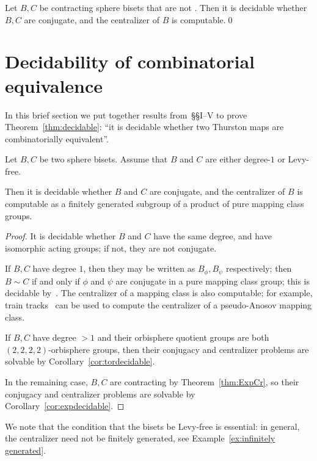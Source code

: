 \documentclass{amsart}
\begin{document}
\begin{cor}\label{cor:expdecidable}
  Let $B,C$ be contracting sphere bisets that are not \Tor. Then it is
  decidable whether $B,C$ are conjugate, and the centralizer of $B$ is
  computable.\qed
\end{cor}

\renewcommand\thesection{\arabic{section}}
\section{Decidability of combinatorial equivalence}\label{ss:decidability}
In this brief section we put together results from~\S\S I--V to prove
Theorem~\ref{thm:decidable}: ``it is decidable whether two Thurston
maps are combinatorially equivalent''.

\begin{thm}\label{thm:conj:LevyFree}
  Let $B,C$ be two sphere bisets. Assume that $B$ and $C$ are either
  degree-$1$ or Levy-free.

  Then it is decidable whether $B$ and $C$ are conjugate, and the
  centralizer of $B$ is computable as a finitely generated subgroup of
  a product of pure mapping class groups.
\end{thm}
\begin{proof}
  It is decidable whether $B$ and $C$ have the same degree, and have
  isomorphic acting groups; if not, they are not conjugate.

  If $B,C$ have degree $1$, then they may be written as
  $B_\phi,B_\psi$ respectively; then $B\sim C$ if and only if $\phi$
  and $\psi$ are conjugate in a pure mapping class group; this is
  decidable by~\cite{hemion:homeos}. The centralizer of a mapping
  class is also computable; for example, train
  tracks~\cite{bestvina-h:tt} can be used to compute the centralizer
  of a pseudo-Anosov mapping class.

  If $B,C$ have degree $>1$ and their orbisphere quotient groups are
  both $(2,2,2,2)$-orbisphere groups, then their conjugacy and
  centralizer problems are solvable by Corollary~\ref{cor:tordecidable}.

  In the remaining case, $B,C$ are contracting by
  Theorem~\ref{thm:ExpCr}, so their conjugacy and centralizer problems
  are solvable by Corollary~\ref{cor:expdecidable}.
\end{proof}
We note that the condition that the bisets be Levy-free is essential:
in general, the centralizer need not be finitely generated, see
Example~\ref{ex:infinitely generated}.
\end{document}
